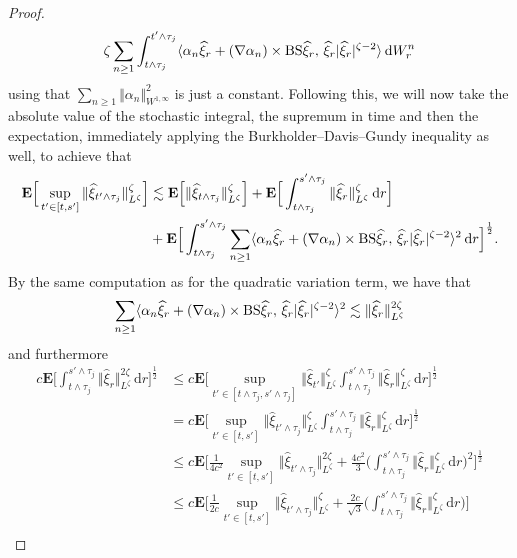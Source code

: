 \documentclass[11pt, a4paper,oneside, reqno]{amsart}
\theoremstyle{remark} %
\theoremstyle{definition} %
\numberwithin{theorem}{section}
\numberwithin{equation}{section}
\newcommand{\abs}[1]{\vert #1 \vert}
\newcommand{\norm}[1]{\Vert #1 \Vert}
\newcommand{\inner}[2]{\langle #1,\, #2 \rangle}
\newcommand{\BS}{{\rm BS}}
\renewcommand{\hat}[1]{\widehat{#1}}
\newcommand{\dd}{\hspace{2pt}\mathrm{d}}
\begin{document}
\begin{proof}
\begin{align*}
    \zeta \sum_{n \geq 1} \int_{t \wedge \tau_j}^{t'\wedge\tau_j}\inner{\alpha_n\hat{\xi}_r + (\nabla \alpha_n) \times \BS\hat{\xi}_r}{\hat{\xi}_r\abs{\hat{\xi}_r}^{\zeta-2}}\dd W^n_r
\end{align*}
using that $\sum_{n \geq 1}\norm{\alpha_n}_{W^{1,\infty}}^2$ is just a constant. Following this, we will now take the absolute value of the stochastic integral, the supremum in time and then the expectation, immediately applying the Burkholder--Davis--Gundy inequality as well, to achieve that
\begin{equation}\label{chosen approp}
    \begin{aligned}
  \mathbf{E}\Big[\sup_{t' \in [t,s']} \norm{\hat{\xi}_{t' \wedge \tau_j}}_{L^{\zeta}}^{\zeta}\Big]  &\lesssim \mathbf{E}\Big[\norm{\hat{\xi}_{t \wedge \tau_j}}_{L^{\zeta}}^{\zeta}\Big] +  \mathbf{E}\Big[\int_{t \wedge \tau_j}^{s'\wedge\tau_j}\norm{\hat{\xi}_r}_{L^{\zeta}}^{\zeta}\dd r\Big]\\ &+
      \mathbf{E}\Big[\int_{t \wedge \tau_j}^{s'\wedge\tau_j}\sum_{n \geq 1}\inner{\alpha_n\hat{\xi}_r + (\nabla \alpha_n) \times \BS\hat{\xi}_r}{\hat{\xi}_r\abs{\hat{\xi}_r}^{\zeta-2}}^2\dd r\Big]^{\frac{1}{2}}. 
\end{aligned}
\end{equation}
By the same computation as for the quadratic variation term, we have that
$$\sum_{n \geq 1}\inner{\alpha_n\hat{\xi}_r + (\nabla \alpha_n) \times \BS\hat{\xi}_r}{\hat{\xi}_r\abs{\hat{\xi}_r}^{\zeta-2}}^2 \lesssim \norm{\hat{\xi}_r}_{L^{\zeta}}^{2\zeta}$$
and furthermore
\begin{align*}
         c\mathbf{E}\Big[\int_{t \wedge \tau_j}^{s'\wedge\tau_j}\norm{\hat{\xi}_r}_{L^{\zeta}}^{2\zeta}\dd r\Big]^{\frac{1}{2}} &\leq c\mathbf{E}\Big[\sup_{t'\in[t\wedge\tau_j,s'\wedge\tau_j]}\norm{\hat{\xi}_{t'}}_{L^{\zeta}}^{\zeta}\int_{t \wedge \tau_j}^{s'\wedge\tau_j}\norm{\hat{\xi}_r}_{L^{\zeta}}^{\zeta}\dd r\Big]^{\frac{1}{2}}\\
         &= c\mathbf{E}\Big[\sup_{t'\in[t,s']}\norm{\hat{\xi}_{t'\wedge\tau_j}}_{L^{\zeta}}^{\zeta}\int_{t \wedge \tau_j}^{s'\wedge\tau_j}\norm{\hat{\xi}_r}_{L^{\zeta}}^{\zeta}\dd r\Big]^{\frac{1}{2}}\\
         &\leq c\mathbf{E}\Big[\frac{1}{4c^2}\sup_{t'\in[t,s']}\norm{\hat{\xi}_{t'\wedge\tau_j}}_{L^{\zeta}}^{2\zeta} + \frac{4c^2}{3}\Big(\int_{t \wedge \tau_j}^{s'\wedge\tau_j}\norm{\hat{\xi}_r}_{L^{\zeta}}^{\zeta}\dd r\Big)^2\Big]^{\frac{1}{2}}\\
         &\leq c\mathbf{E}\Big[\frac{1}{2c}\sup_{t'\in[t,s']}\norm{\hat{\xi}_{t'\wedge\tau_j}}_{L^{\zeta}}^{\zeta} + \frac{2c}{\sqrt{3}}\Big(\int_{t \wedge \tau_j}^{s'\wedge\tau_j}\norm{\hat{\xi}_r}_{L^{\zeta}}^{\zeta}\dd r\Big)\Big]\\

\end{align*}
\end{proof}
\end{document}
